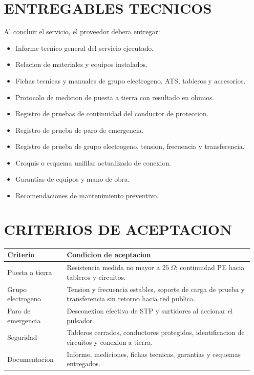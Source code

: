 \documentclass[12pt,letterpaper]{report}
\newcommand{\reqheader}{\rowcolor{azulunap!14}}
\begin{document}
\section{ENTREGABLES TECNICOS}

Al concluir el servicio, el proveedor debera entregar:

\begin{itemize}
  \item Informe tecnico general del servicio ejecutado.
  \item Relacion de materiales y equipos instalados.
  \item Fichas tecnicas y manuales de grupo electrogeno, ATS, tableros y accesorios.
  \item Protocolo de medicion de puesta a tierra con resultado en ohmios.
  \item Registro de pruebas de continuidad del conductor de proteccion.
  \item Registro de prueba de paro de emergencia.
  \item Registro de prueba de grupo electrogeno, tension, frecuencia y transferencia.
  \item Croquis o esquema unifilar actualizado de conexion.
  \item Garantias de equipos y mano de obra.
  \item Recomendaciones de mantenimiento preventivo.
\end{itemize}

\section{CRITERIOS DE ACEPTACION}

\begin{table}[H]
\centering
\renewcommand{\arraystretch}{1.18}
\begin{tabularx}{\textwidth}{P{0.25\textwidth} L}
\toprule
\reqheader \textbf{Criterio} & \textbf{Condicion de aceptacion} \\
\midrule
Puesta a tierra & Resistencia medida no mayor a \(25\ \Omega\); continuidad PE hacia tableros y circuitos. \\
Grupo electrogeno & Tension y frecuencia estables, soporte de carga de prueba y transferencia sin retorno hacia red publica. \\
Paro de emergencia & Desconexion efectiva de STP y surtidores al accionar el pulsador. \\
Seguridad & Tableros cerrados, conductores protegidos, identificacion de circuitos y conexion a tierra. \\
Documentacion & Informe, mediciones, fichas tecnicas, garantias y esquemas entregados. \\
\bottomrule
\end{tabularx}
\end{table}
\end{document}
